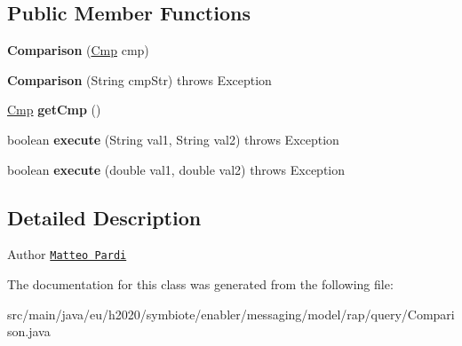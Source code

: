\subsection*{Public Member Functions}
\begin{DoxyCompactItemize}
\item 
\mbox{\label{classeu_1_1h2020_1_1symbiote_1_1enabler_1_1messaging_1_1model_1_1rap_1_1query_1_1Comparison_ac52b8d235eb9459c23fe4ced09310afa}} 
{\bfseries Comparison} (\hyperlink{enumeu_1_1h2020_1_1symbiote_1_1enabler_1_1messaging_1_1model_1_1rap_1_1query_1_1Comparison_1_1Cmp}{Cmp} cmp)
\item 
\mbox{\label{classeu_1_1h2020_1_1symbiote_1_1enabler_1_1messaging_1_1model_1_1rap_1_1query_1_1Comparison_a64621f69eb8f9451ddd40d857be9f4c6}} 
{\bfseries Comparison} (String cmp\+Str)  throws Exception 
\item 
\mbox{\label{classeu_1_1h2020_1_1symbiote_1_1enabler_1_1messaging_1_1model_1_1rap_1_1query_1_1Comparison_a67995ad900a1593171dbe1fcefdf84a3}} 
\hyperlink{enumeu_1_1h2020_1_1symbiote_1_1enabler_1_1messaging_1_1model_1_1rap_1_1query_1_1Comparison_1_1Cmp}{Cmp} {\bfseries get\+Cmp} ()
\item 
\mbox{\label{classeu_1_1h2020_1_1symbiote_1_1enabler_1_1messaging_1_1model_1_1rap_1_1query_1_1Comparison_ae7d9759e691ab42206309d8d51f798d5}} 
boolean {\bfseries execute} (String val1, String val2)  throws Exception 
\item 
\mbox{\label{classeu_1_1h2020_1_1symbiote_1_1enabler_1_1messaging_1_1model_1_1rap_1_1query_1_1Comparison_a97b7464fb0f66a72d4339b176cf8d532}} 
boolean {\bfseries execute} (double val1, double val2)  throws Exception 
\end{DoxyCompactItemize}


\subsection{Detailed Description}
\begin{DoxyAuthor}{Author}
\href{mailto:m.pardi@nextworks.it}{\tt Matteo Pardi} 
\end{DoxyAuthor}


The documentation for this class was generated from the following file\+:\begin{DoxyCompactItemize}
\item 
src/main/java/eu/h2020/symbiote/enabler/messaging/model/rap/query/Comparison.\+java\end{DoxyCompactItemize}
